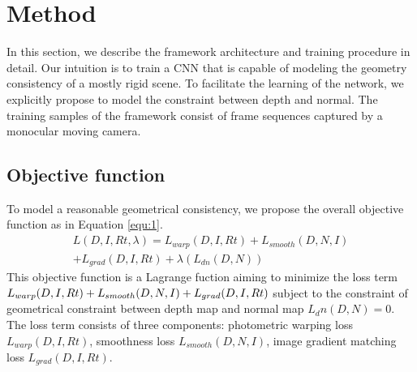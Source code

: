 \section{Method}
In this section, we describe the framework architecture and training procedure in detail.
Our intuition is to train a CNN that is capable of modeling the geometry consistency of a mostly rigid scene. To facilitate the learning of the network, we explicitly propose to model the constraint between depth and normal. The training samples of the framework consist of frame sequences captured by a monocular moving camera.
  
\subsection{Objective function}
To model a reasonable geometrical consistency, we propose the overall objective function as in Equation \ref{equ:1}.
\begin{equation}
\label{equ:1}
\begin{split}
L(D, I, Rt, \lambda) = L_{warp}(D, I, Rt) + L_{smooth}(D, N, I) \\
 +  L_{grad}(D, I, Rt) + \lambda(L_{dn}(D, N))
\end{split}
\end{equation}
This objective function is a Lagrange fuction aiming to minimize the loss term $L_{warp}(D, I, Rt) + L_{smooth}(D, N, I) \\
 +  L_{grad}(D, I, Rt)$ subject to the constraint of geometrical constraint between depth map and normal map $L_dn(D, N) = 0$. The loss term consists of three components: photometric warping loss $L_{warp}(D, I, Rt)$, smoothness loss $L_{smooth}(D, N, I)$, image gradient matching loss $L_{grad}(D, I, Rt)$.
 
